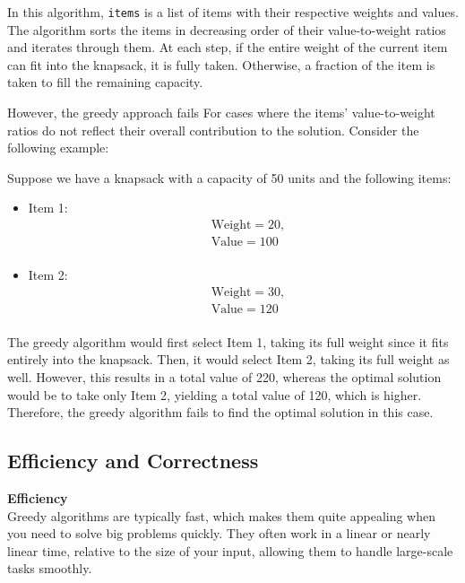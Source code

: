 \documentclass[12pt]{book} %
\begin{document}
In this algorithm, \texttt{items} is a list of items with their respective weights and values. The algorithm sorts the items in decreasing order of their value-to-weight ratios and iterates through them. At each step, if the entire weight of the current item can fit into the knapsack, it is fully taken. Otherwise, a fraction of the item is taken to fill the remaining capacity.

However, the greedy approach fails For cases where the items' value-to-weight ratios do not reflect their overall contribution to the solution. Consider the following example:

Suppose we have a knapsack with a capacity of 50 units and the following items:

\begin{itemize}
    \item Item 1:
    \[
    \begin{aligned}
    & \text{Weight} = 20, \\
    & \text{Value} = 100 \\
    \end{aligned}
    \]

    \item Item 2:
    \[
    \begin{aligned}
    & \text{Weight} = 30, \\
    & \text{Value} = 120 \\
    \end{aligned}
    \]
\end{itemize}

The greedy algorithm would first select Item 1, taking its full weight since it fits entirely into the knapsack. Then, it would select Item 2, taking its full weight as well. However, this results in a total value of 220, whereas the optimal solution would be to take only Item 2, yielding a total value of 120, which is higher. Therefore, the greedy algorithm fails to find the optimal solution in this case.

\subsection{Efficiency and Correctness}

\textbf{Efficiency}\\
Greedy algorithms are typically fast, which makes them quite appealing when you need to solve big problems quickly. They often work in a linear or nearly linear time, relative to the size of your input, allowing them to handle large-scale tasks smoothly.
\end{document}
